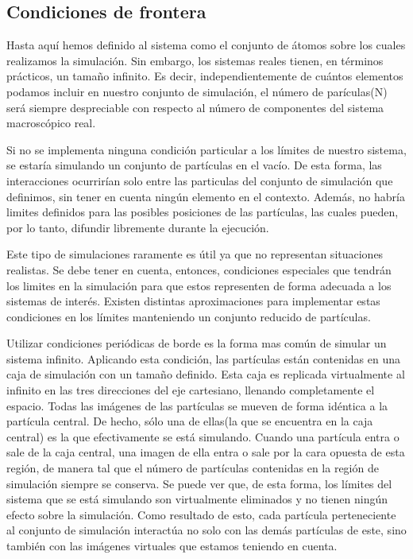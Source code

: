 \subsection{Condiciones de frontera} \label{frontera}

Hasta aquí hemos definido al sistema como el conjunto de átomos sobre los cuales realizamos la simulación. 
Sin embargo, los sistemas reales tienen, en términos prácticos, un tamaño infinito. 
Es decir, independientemente de cuántos elementos podamos incluir en nuestro conjunto de simulación, el número de parículas(N) será siempre despreciable con respecto al número de componentes del sistema macroscópico real.

Si no se implementa ninguna condición particular a los límites de nuestro sistema, se estaría simulando un conjunto de partículas en el vacío. 
De esta forma, las interacciones ocurrirían solo entre las particulas del conjunto de simulación que definimos, sin tener en cuenta ningún elemento en el contexto.
Además, no habría limites definidos para las posibles posiciones de las partículas, las cuales pueden, por lo tanto, difundir libremente durante la ejecución.

Este tipo de simulaciones raramente es útil ya que no representan situaciones realistas. Se debe tener en cuenta, entonces, condiciones especiales que tendrán los limites en la simulación para que estos representen de forma adecuada a los sistemas de interés.
Existen distintas aproximaciones para implementar estas condiciones en los límites manteniendo un conjunto reducido de partículas.

Utilizar condiciones periódicas de borde es la forma mas común de simular un sistema infinito. Aplicando esta condición, las partículas están contenidas en una caja de simulación con un tamaño definido. 
Esta caja es replicada virtualmente al infinito en las tres direcciones del eje cartesiano, llenando completamente el espacio.
Todas las imágenes de las partículas se mueven de forma idéntica a la partícula central. De hecho, sólo una de ellas(la que se encuentra en la caja central) es la que efectivamente se está simulando.
Cuando una partícula entra o sale de la caja central, una imagen de ella entra o sale por la cara opuesta de esta región, de manera tal que el número de partículas contenidas en la región de simulación siempre se conserva.
Se puede ver que, de esta forma, los límites del sistema que se está simulando son virtualmente eliminados y no tienen ningún efecto sobre la simulación.
Como resultado de esto, cada partícula perteneciente al conjunto de simulación interactúa no solo con las demás partículas de este, sino también con las imágenes virtuales que estamos teniendo en cuenta.

